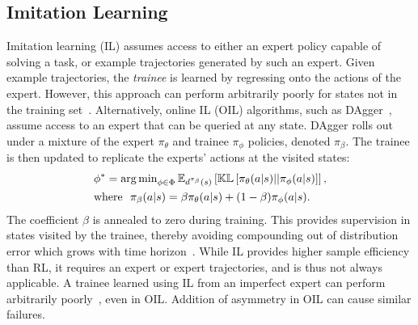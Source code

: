 \subsection{Imitation Learning}
Imitation learning (IL) assumes access to either an expert policy capable of solving a task, or example trajectories generated by such an expert.  Given example trajectories, the \emph{trainee} is learned by regressing onto the actions of the expert.  However, this approach can perform arbitrarily poorly for states not in the training set~\citep{laskey2017dart}.  Alternatively, online IL (OIL) algorithms, such as DAgger~\citep{Ross2011}, assume access to an expert that can be queried at any state.  DAgger rolls out under a mixture of the expert $\pi_{\theta}$ and trainee $\pi_{\phi}$ policies, denoted $\pi_{\beta}$.  The trainee is then updated to replicate the experts' actions at the visited states:
\begin{align}
    & \phi^* = \operatorname{arg\,min}_{\phi \in \Phi} \mathbb{E}_{d^{\pi_{\beta}}(s)} \left[ \mathbb{KL} \left[ \pi_{\theta}(a|s) || \pi_{\phi}(a|s) \right] \right],  \\
    & \mathrm{where}\ \ \pi_{\beta}(a | s) = \beta \pi_{\theta}(a | s) + (1-\beta) \pi_{\phi}(a | s). \label{equ:background:dagger_mixture}
\end{align}
The coefficient $\beta$ is annealed to zero during training.  This provides supervision in states visited by the trainee, thereby avoiding compounding out of distribution error which grows with time horizon~\cite{Ross2011,pmlr-v70-sun17d}.  While IL provides higher sample efficiency than RL, it requires an expert or expert trajectories, and is thus not always applicable.  A trainee learned using IL from an imperfect expert can perform arbitrarily poorly~\cite{pmlr-v70-sun17d}, even in OIL.  Addition of asymmetry in OIL can cause similar failures.

